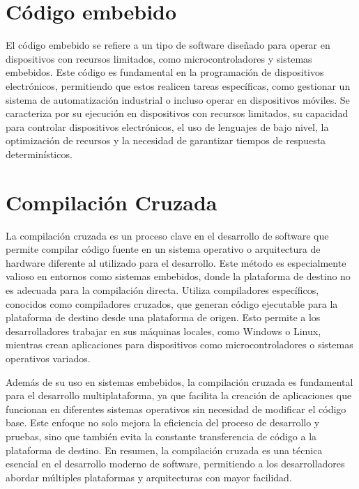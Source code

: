 \section{Código embebido}

El código embebido se refiere a un tipo de software diseñado para operar en dispositivos con recursos limitados, como microcontroladores y sistemas embebidos. 
Este código es fundamental en la programación de dispositivos electrónicos, permitiendo que estos realicen tareas específicas, como gestionar un sistema de 
automatización industrial o incluso operar en dispositivos móviles. Se caracteriza por su ejecución en dispositivos con recursos limitados, su capacidad 
para controlar dispositivos electrónicos, el uso de lenguajes de bajo nivel, la optimización de recursos y la necesidad de garantizar tiempos de respuesta 
determinísticos.

\section{Compilación Cruzada}

La compilación cruzada es un proceso clave en el desarrollo de software que permite compilar código fuente en un sistema operativo o arquitectura de hardware diferente al utilizado para el desarrollo. Este método es especialmente valioso en entornos como sistemas embebidos, donde la plataforma de destino no es adecuada para la compilación directa. Utiliza compiladores específicos, conocidos como compiladores cruzados, que generan código ejecutable para la plataforma de destino desde una plataforma de origen. Esto permite a los desarrolladores trabajar en sus máquinas locales, como Windows o Linux, mientras crean aplicaciones para dispositivos como microcontroladores o sistemas operativos variados.


Además de su uso en sistemas embebidos, la compilación cruzada es fundamental para el desarrollo multiplataforma, ya que facilita la creación de aplicaciones que funcionan en diferentes sistemas operativos sin necesidad de modificar el código base. Este enfoque no solo mejora la eficiencia del proceso de desarrollo y pruebas, sino que también evita la constante transferencia de código a la plataforma de destino. En resumen, la compilación cruzada es una técnica esencial en el desarrollo moderno de software, permitiendo a los desarrolladores abordar múltiples plataformas y arquitecturas con mayor facilidad.

